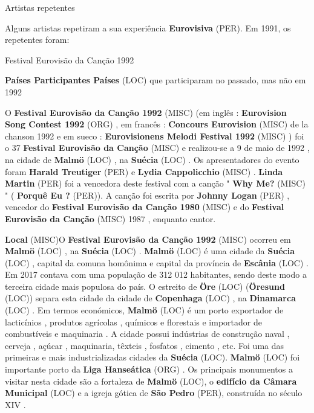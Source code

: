 \documentclass[12pt,a4paper]{article}
\begin{document}
Artistas repetentes

Alguns artistas repetiram a sua experiência \textbf{Eurovisiva} (PER). Em 1991, os repetentes foram:



Festival Eurovisão da Canção 1992



\textbf{Países Participantes Países} (LOC) que participaram no passado, mas não em 1992

O \textbf{Festival Eurovisão da Canção 1992} (MISC) (em inglês : \textbf{Eurovision Song Contest 1992} (ORG) , em francês : \textbf{Concours Eurovision} (MISC) de la chanson 1992 e em sueco : \textbf{Eurovisionens Melodi Festival 1992} (MISC) ) foi o 37 \textbf{Festival Eurovisão da Canção} (MISC) e realizou-se a 9 de maio de 1992 , na cidade de \textbf{Malmö} (LOC) , na \textbf{Suécia} (LOC) . Os apresentadores do evento foram \textbf{Harald Treutiger} (PER) e \textbf{Lydia Cappolicchio} (MISC) . \textbf{Linda Martin} (PER) foi a vencedora deste festival com a canção " \textbf{Why Me?} (MISC) " ( \textbf{Porquê Eu ?} (PER)). A canção foi escrita por \textbf{Johnny Logan} (PER) , vencedor do \textbf{Festival Eurovisão da Canção 1980} (MISC) e do \textbf{Festival Eurovisão da Canção} (MISC) 1987 , enquanto cantor.



\textbf{Local} (MISC)O \textbf{Festival Eurovisão da Canção 1992} (MISC) ocorreu em \textbf{Malmö} (LOC) , na \textbf{Suécia} (LOC) . \textbf{Malmö} (LOC) é uma cidade da \textbf{Suécia} (LOC) , capital da comuna homônima e capital da província de \textbf{Escânia} (LOC) . Em 2017 contava com uma população de 312 012 habitantes, sendo deste modo a terceira cidade mais populosa do país. O estreito de \textbf{Öre} (LOC) (\textbf{Öresund} (LOC)) separa esta cidade da cidade de \textbf{Copenhaga} (LOC) , na \textbf{Dinamarca} (LOC) . Em termos económicos, \textbf{Malmö} (LOC) é um porto exportador de lacticínios , produtos agrícolas , químicos e florestais e importador de combustíveis e maquinaria . A cidade possui indústrias de construção naval , cerveja , açúcar , maquinaria, têxteis , fosfatos , cimento , etc. Foi uma das primeiras e mais industrializadas cidades da \textbf{Suécia} (LOC). \textbf{Malmö} (LOC) foi importante porto da \textbf{Liga Hanseática} (ORG) . Os principais monumentos a visitar nesta cidade são a fortaleza de \textbf{Malmö} (LOC), o \textbf{edifício da Câmara Municipal} (LOC) e a igreja gótica de \textbf{São Pedro} (PER), construída no século XIV .
\end{document}
